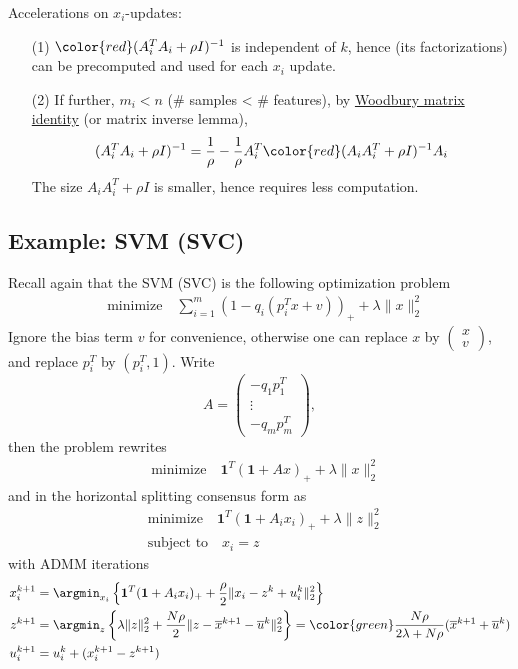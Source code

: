 Accelerations on $x_i$-updates:
\begin{itemize}
    \item[(1)] $\color{red} (A_i^TA_i + \rho I)^{-1}$ is independent of $k$, hence (its factorizations) can be precomputed and used for each $x_i$ update.
    \item[(2)] If further, $m_i < n$ (\# samples < \# features), by \href{https://en.wikipedia.org/wiki/Woodbury_matrix_identity}{Woodbury matrix identity} (or matrix inverse lemma),
    $$(A_i^TA_i + \rho I)^{-1} = \dfrac{1}{\rho} - \dfrac{1}{\rho} A_i^T {\color{red} (A_iA_i^T + \rho I)^{-1}} A_i$$
    The size $A_iA_i^T + \rho I$ is smaller, hence requires less computation.
\end{itemize}

\subsection{Example: SVM (SVC)}

Recall again that the SVM (SVC) is the following optimization problem
\begin{align*}
    & \text{minimize} \quad \sum\limits_{i=1}^m (1 - q_i( p_i^Tx + v))_+ + \lambda \lVert x \rVert_2^2
\end{align*}
Ignore the bias term $v$ for convenience, otherwise one can replace $x$ by $\begin{pmatrix} x \\ v \end{pmatrix}$, and replace $p_i^T$ by $(p_i^T, 1)$. Write
$$A = \begin{pmatrix} -q_1p_1^T \\ \vdots \\ -q_mp_m^T \end{pmatrix},$$
then the problem rewrites
\begin{align*}
    & \text{minimize} \quad  \mathbf{1}^T (\mathbf{1} + Ax)_+ + \lambda \lVert x \rVert_2^2
\end{align*}
and in the horizontal splitting consensus form as
\begin{align*}
    & \text{minimize} \quad \mathbf{1}^T (\mathbf{1} + A_ix_i)_+ + \lambda \lVert z \rVert_2^2 \\
    & \text{subject to} \quad x_i = z
\end{align*}
with ADMM iterations
\begin{align*}
    x_i^{k+1} & = \argmin_{x_i} \left\{ \mathbf{1}^T (\mathbf{1} + A_ix_i)_+ + \dfrac{\rho}{2} \lVert x_i - z^k + u_i^k \rVert_2^2 \right\} \\
    z^{k+1} & = \argmin_z \left\{ \lambda \lVert z \rVert_2^2 + \dfrac{N\rho}{2} \lVert z - \overline{x}^{k+1} - \overline{u}^k \rVert_2^2 \right\} = {\color{green} \dfrac{N\rho}{2\lambda + N\rho}} (\overline{x}^{k+1} + \overline{u}^k) \\
    u_i^{k+1} & = u_i^k + (x_i^{k+1} - z^{k+1})
\end{align*}

